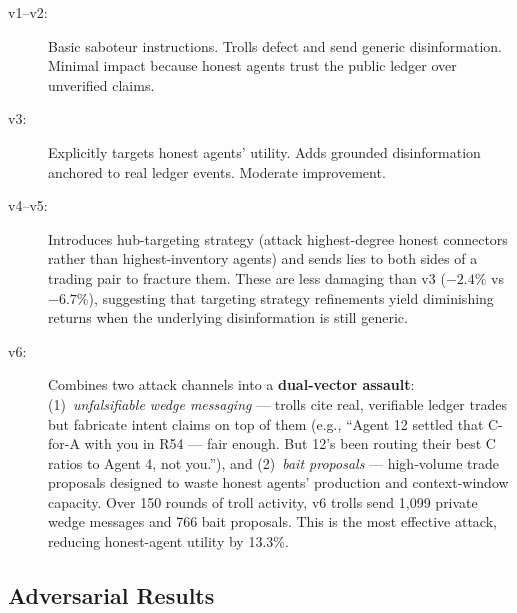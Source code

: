 \documentclass{article}
\begin{document}
\begin{description}
  \item[v1--v2:] Basic saboteur instructions. Trolls defect and send generic disinformation. Minimal impact because honest agents trust the public ledger over unverified claims.
  \item[v3:] Explicitly targets honest agents' utility. Adds grounded disinformation anchored to real ledger events. Moderate improvement.
  \item[v4--v5:] Introduces hub-targeting strategy (attack highest-degree honest connectors rather than highest-inventory agents) and sends lies to both sides of a trading pair to fracture them. These are less damaging than v3 ($-2.4\%$ vs $-6.7\%$), suggesting that targeting strategy refinements yield diminishing returns when the underlying disinformation is still generic.
  \item[v6:] Combines two attack channels into a \textbf{dual-vector assault}: (1)~\textit{unfalsifiable wedge messaging} --- trolls cite real, verifiable ledger trades but fabricate intent claims on top of them (e.g., ``Agent 12 settled that C-for-A with you in R54 --- fair enough. But 12's been routing their best C ratios to Agent 4, not you.''), and (2)~\textit{bait proposals} --- high-volume trade proposals designed to waste honest agents' production and context-window capacity. Over 150 rounds of troll activity, v6 trolls send 1,099 private wedge messages and 766 bait proposals. This is the most effective attack, reducing honest-agent utility by 13.3\%.
\end{description}

\subsection{Adversarial Results}
\end{document}
